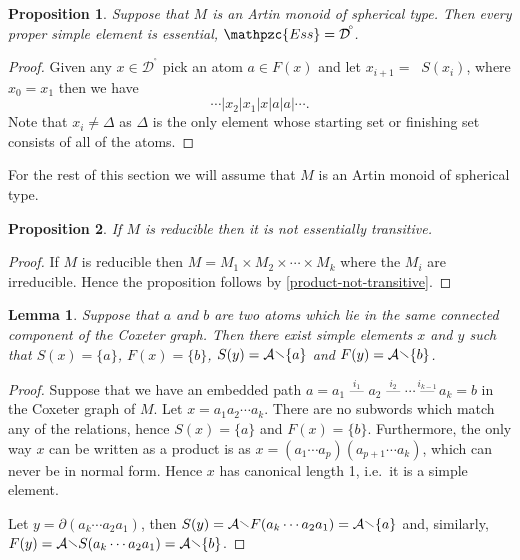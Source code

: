 \documentclass[a4paper,final]{article}
\theoremstyle{plain}
\newtheorem{lemma}[lemma]{Lemma}
\newtheorem{proposition}[proposition]{Proposition}
\theoremstyle{remark}
\theoremstyle{definition}
\begin{document}
\begin{proposition}\label{Artin-ProperSimplesEssential}
  Suppose that $M$ is an Artin monoid of spherical type.  Then every proper
  simple element is essential, ${\mathpzc{Ess}} = {{\mathcal{D}}^{\!{}^{\circ}\!}}$.
\end{proposition}
\begin{proof}
  Given any $x \in {{\mathcal{D}}^{\!{}^{\circ}\!}}$ pick an atom $a \in {F}(x)$ and let
  $x_{i+1} = {\mathop{\widetilde{\bigvee}}} {S}(x_i)$, where $x_0 = x_1$ then we have
  \[ \cdots | x_2 | x_1 | x | a | a | \cdots. \]
  Note that $x_i \ne \Delta$ as $\Delta$ is the only element whose
  starting set or finishing set consists of all of the atoms.
\end{proof}

For the rest of this section we will assume that $M$ is an Artin monoid of spherical type.

\begin{proposition}
  If $M$ is reducible then it is not essentially transitive.
\end{proposition}
\begin{proof}
  If $M$ is reducible then $M = M_1 \times M_2 \times \cdots \times
  M_k$ where the $M_i$ are irreducible.  Hence the proposition follows by
  \autoref{product-not-transitive}.
\end{proof}

\begin{lemma} \label{connecting-atoms}
  Suppose that $a$ and $b$ are two atoms which lie in the same
  connected component of the Coxeter graph.  Then there exist
  simple elements $x$ and $y$ such that ${S}(x) = \{ a \}$,
  ${F}(x) = \{ b \}$, ${S}(y) = {\mathcal{A}}{\mathbin{\raisebox{0.25ex}{$\smallsetminus$}}}\{a\}$ and ${F}(y)
  = {\mathcal{A}}{\mathbin{\raisebox{0.25ex}{$\smallsetminus$}}}\{b\}$.
\end{lemma}
\begin{proof}
  Suppose that we have an embedded path $a=a_1
  \overset{i_1}{\text{ --- }} a_2 \overset{i_2}{\text{ --- }} \cdots
  \overset{i_{k-1}}{\text{ --- }} a_k=b$ in the Coxeter graph of $M$.
  Let $x = a_1 a_2 \cdots a_k$.  There are no subwords which match any
  of the relations, hence ${S}(x) = \{ a \}$ and ${F}(x) = \{ b
  \}$.  Furthermore, the only way $x$ can be written as a product is
  as $x = (a_1 \cdots a_p)(a_{p+1} \cdots a_k)$, which can never be in
  normal form.  Hence $x$ has canonical length 1, i.e.\ it is a simple
  element.

  Let $y = {\partial} (a_k \cdots a_2 a_1)$, then ${S}(y) = {\mathcal{A}}
  {\mathbin{\raisebox{0.25ex}{$\smallsetminus$}}} {F}(a_k \cdots a_2 a_1) = {\mathcal{A}} {\mathbin{\raisebox{0.25ex}{$\smallsetminus$}}} \{a\}$ and,
  similarly, ${F}(y) = {\mathcal{A}} {\mathbin{\raisebox{0.25ex}{$\smallsetminus$}}} {S}(a_k \cdots a_2 a_1) =
  {\mathcal{A}} {\mathbin{\raisebox{0.25ex}{$\smallsetminus$}}} \{b\}$.  
\end{proof}
\end{document}
